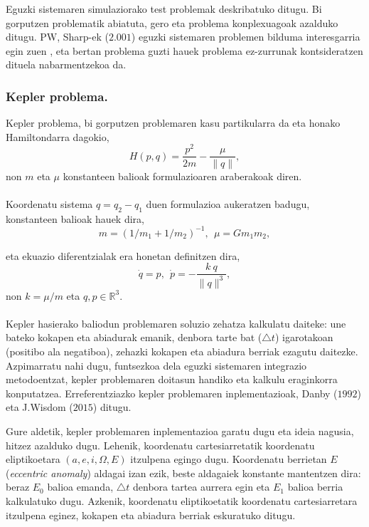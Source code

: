 Eguzki sistemaren simulaziorako test problemak deskribatuko ditugu. Bi gorputzen problematik abiatuta, gero eta problema konplexuagoak azalduko ditugu. PW, Sharp-ek ($2.001$) eguzki sistemaren problemen bilduma interesgarria egin zuen \cite{Sharp2001} , eta bertan problema guzti hauek problema ez-zurrunak kontsideratzen dituela nabarmentzekoa da.      

\subsubsection*{Kepler problema.}
\label{ss:keplerproblem}

Kepler problema, bi gorputzen problemaren kasu partikularra da eta  honako Hamiltondarra dagokio,
\begin{equation}
H(p,q)=\frac{p^2}{2m}-\frac{\mu}{\|q\|},
\end{equation}
non $m$ eta $\mu$ konstanteen balioak formulazioaren araberakoak diren.

\paragraph*{}Koordenatu sistema $q=q_2-q_1$ duen formulazioa aukeratzen badugu, konstanteen balioak hauek dira,  
\begin{equation*}
m=(1/m_1+1/m_2)^{-1},\ \ \mu=Gm_1m_2,
\end{equation*} 

eta ekuazio diferentzialak era honetan definitzen dira,
\begin{equation}
\dot{q}=p, \ \ \dot{p}= - \frac{k \ q}{\|q\|^3} ,
\end{equation}
non $k= \mu / m$ eta  $q,p \in \mathbb{R}^3$.

\paragraph{} Kepler hasierako baliodun problemaren soluzio zehatza kalkulatu daiteke: une bateko kokapen eta abiadurak emanik, denbora tarte bat ($\triangle t$) igarotakoan (positibo ala negatiboa), zehazki kokapen eta abiadura berriak ezagutu daitezke. Azpimarratu nahi dugu, funtsezkoa dela eguzki sistemaren integrazio metodoentzat, kepler problemaren doitasun handiko eta kalkulu eraginkorra konputatzea. Erreferentziazko kepler problemaren inplementazioak, Danby ($1992$) \cite{Danby1992} eta J.Wisdom ($2015$) \cite{Wisdom2015} ditugu. 

Gure aldetik, kepler problemaren inplementazioa garatu dugu eta ideia nagusia, hitzez azalduko dugu. Lehenik, koordenatu cartesiarretatik koordenatu eliptikoetara $(a,e,i,\Omega,E)$ itzulpena egingo dugu. Koordenatu berrietan $E$ (\emph{eccentric anomaly}) aldagai izan ezik, beste aldagaiek konstante mantentzen dira: beraz $E_0$ balioa emanda, $\triangle t$ denbora tartea aurrera egin eta $E_1$ balioa berria kalkulatuko dugu. Azkenik, koordenatu eliptikoetatik koordenatu cartesiarretara itzulpena eginez, kokapen eta abiadura berriak eskuratuko ditugu. 


